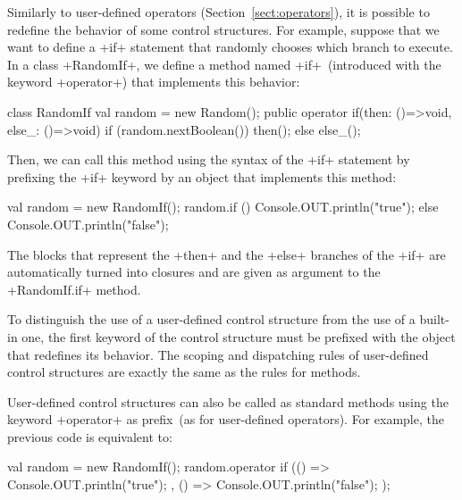 Similarly to user-defined operators (Section~\ref{sect:operators}), it is possible to redefine the
behavior of some control structures.
%
For example, suppose that we want to define a \xcd+if+ statement that
randomly chooses which branch to execute. In a class \xcd+RandomIf+,
we define a method named \xcd+if+~(introduced with the keyword
\xcd+operator+) that implements this behavior:
\begin{xten}
class RandomIf {
    val random = new Random();
    public operator if(then: ()=>void, else_: ()=>void) {
        if (random.nextBoolean()) {
            then();
        } else {
            else_();
        }
    }
}
\end{xten}
Then, we can call this method using the syntax of the \xcd+if+
statement by prefixing the \xcd+if+ keyword by an object that
implements this method:
\begin{xten}
    val random = new RandomIf();
    random.if () {
        Console.OUT.println("true");
    } else {
        Console.OUT.println("false");
    }
\end{xten}
The blocks that represent the \xcd+then+ and the \xcd+else+ branches
of the \xcd+if+ are automatically turned into closures and are given
as argument to the \xcd+RandomIf.if+ method.

To distinguish the use of a user-defined control structure from the
use of a built-in one, the first keyword of the control structure must
be prefixed with the object that redefines its behavior.
%
The scoping and dispatching rules of user-defined control structures
are exactly the same as the rules for methods.


User-defined control structures can also be called as standard methods
using the keyword \xcd+operator+ as prefix~(as for user-defined
operators). For example, the previous code is equivalent to:
\begin{xten}
    val random = new RandomIf();
    random.operator if (() => { Console.OUT.println("true"); },
                        () => { Console.OUT.println("false"); });
\end{xten}

